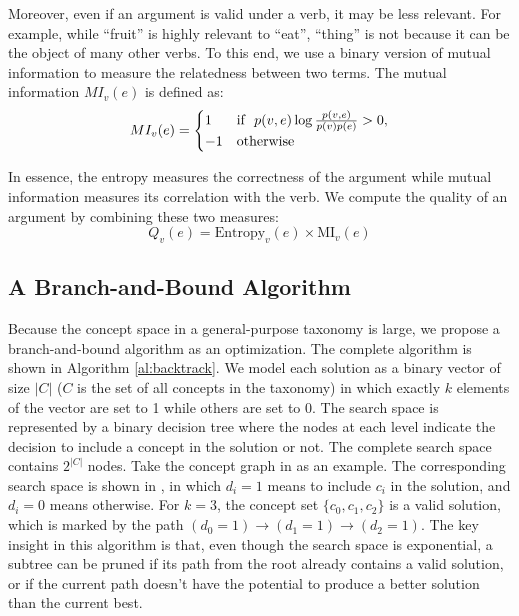 Moreover, even if an argument is valid under a verb, it may be
less relevant. For example, while ``fruit'' is highly relevant to ``eat'',
``thing'' is not because it can be the object of many other verbs.
To this end, we use a binary version of mutual information to
measure the relatedness between two terms.
The mutual information $MI_v(e)$ is defined as:
\begin{equation}
MI_v(e)=
\begin{cases}
1 & \mbox{if}~\ p(v,e)\log \frac{p(v,e)}{p(v)p(e)}> 0,\\
-1 & \rm{otherwise}
\end{cases}
\end{equation}

In essence, the entropy measures the correctness of the argument while
mutual information measures its correlation with the verb.
We compute the quality of an argument by combining these two measures:
\begin{equation}
Q_v(e)=\text{Entropy}_v(e)\times \text{MI}_v(e)
\label{eq:qe}
\end{equation}

\subsection{A Branch-and-Bound Algorithm}
\label{sec:bb}
Because the concept space in a general-purpose taxonomy is large,
we propose a branch-and-bound algorithm as an optimization.
The complete algorithm is shown in Algorithm \ref{al:backtrack}.
We model each solution as a binary vector of size $|C|$ ($C$ is
the set of all concepts in the taxonomy) in which exactly
$k$ elements of the vector are set to 1 while others are set to 0.
The search space is represented by a binary decision tree
where the nodes at each level indicate the decision to include a concept in
the solution or not. The complete search space contains $2^{|C|}$ nodes.
Take the concept graph in  as an example.
The corresponding search space is shown in ,
in which $d_i=1$ means to include $c_i$ in the solution, and $d_i=0$ means
otherwise. For $k=3$, the concept set $\{c_0,c_1,c_2\}$ is
a valid solution, which is marked by the path
$(d_0=1) \rightarrow (d_1=1) \rightarrow (d_2=1)$. The key insight in this algorithm
is that, even though the search space is exponential, a subtree can be
pruned if its path from the root already contains a valid solution, or
if the current path doesn't have the potential to produce a better solution
than the current best.

